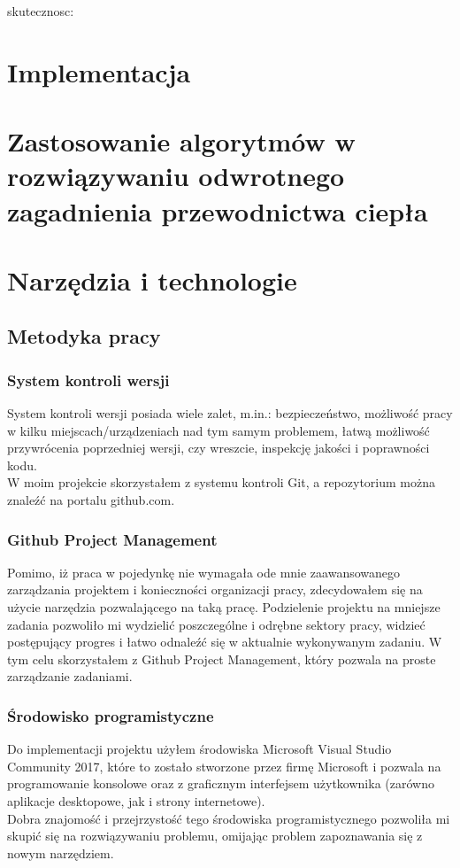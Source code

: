 \documentclass[twoside]{projektInzynierskiMS1}
\newcommand{\si}{ś}
\newcommand{\SI}{Ś}
\begin{document}
skutecznosc:\\

\section{Implementacja}
\section{Zastosowanie algorytmów w rozwiązywaniu odwrotnego zagadnienia przewodnictwa ciepła}
\section{Narzędzia i technologie}
	\subsection{Metodyka pracy}
	\subsubsection{System kontroli wersji}
	System kontroli wersji posiada wiele zalet, m.in.: bezpieczeństwo, możliwo\si ć pracy w kilku miejscach/urządzeniach nad tym samym problemem, łatwą możliwo\si ć przywrócenia poprzedniej wersji, czy wreszcie, inspekcję jako\si ci i poprawno\si ci kodu. \\
W moim projekcie skorzystałem z systemu kontroli Git, a repozytorium można znaleźć na portalu github.com. 
	\subsubsection{Github Project Management}
Pomimo, iż praca w pojedynkę nie wymagała ode mnie zaawansowanego zarządzania projektem i konieczno\si ci organizacji pracy, zdecydowałem się na użycie narzędzia pozwalającego na taką pracę. Podzielenie projektu na mniejsze zadania pozwoliło mi wydzielić poszczególne i odrębne sektory pracy, widzieć postępujący progres i łatwo odnaleźć się w aktualnie wykonywanym zadaniu. W tym celu skorzystałem z Github Project Management, który pozwala na proste zarządzanie zadaniami.
	\subsubsection{\SI rodowisko programistyczne}
Do implementacji projektu użyłem \si rodowiska Microsoft Visual Studio Community 2017, które to zostało stworzone przez firmę Microsoft i pozwala na programowanie konsolowe oraz z graficznym interfejsem użytkownika (zarówno aplikacje desktopowe, jak i strony internetowe).  \\
Dobra znajomo\si ć i przejrzysto\si ć tego \si rodowiska programistycznego pozwoliła mi skupić się na rozwiązywaniu problemu, omijając problem zapoznawania się z nowym narzędziem.
\end{document}
